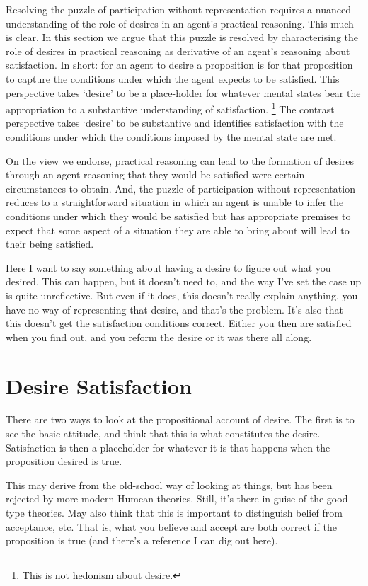 \documentclass[10pt]{article}
\begin{document}
Resolving the puzzle of participation without representation requires a nuanced understanding of the role of desires in an agent's practical reasoning.
This much is clear.
In this section we argue that this puzzle is resolved by characterising the role of desires in practical reasoning as derivative of an agent's reasoning about satisfaction.
In short: for an agent to desire a proposition is for that proposition to capture the conditions under which the agent expects to be satisfied.
This perspective takes `desire' to be a place-holder for whatever mental states bear the appropriation to a substantive understanding of satisfaction.\nolinebreak
\footnote{\color{red} This is not hedonism about desire.}
The contrast perspective takes `desire' to be substantive and identifies satisfaction with the conditions under which the conditions imposed by the mental state are met.

On the view we endorse, practical reasoning can lead to the formation of desires through an agent reasoning that they would be satisfied were certain circumstances to obtain.
And, the puzzle of participation without representation reduces to a straightforward situation in which an agent is unable to infer the conditions under which they would be satisfied but has appropriate premises to expect that some aspect of a situation they are able to bring about will lead to their being satisfied.

{\color{red}
  Here I want to say something about having a desire to figure out what you desired.
  This can happen, but it doesn't need to, and the way I've set the case up is quite unreflective.
  But even if it does, this doesn't really explain anything, you have no way of representing that desire, and that's the problem.
  It's also that this doesn't get the satisfaction conditions correct.
  Either you then are satisfied when you find out, and you reform the desire or it was there all along.
}

\section{Desire Satisfaction}
\label{sec:desire-satisfaction}

There are two ways to look at the propositional account of desire.
The first is to see the basic attitude, and think that this is what constitutes the desire.
Satisfaction is then a placeholder for whatever it is that happens when the proposition desired is true.

This may derive from the old-school way of looking at things, but has been rejected by more modern Humean theories.
Still, it's there in guise-of-the-good type theories.
May also think that this is important to distinguish belief from acceptance, etc.
That is, what you believe and accept are both correct if the proposition is true (and there's a reference I can dig out here).
\end{document}
